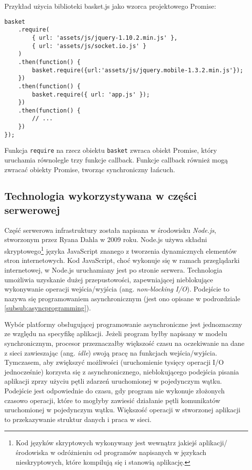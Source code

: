 Przykład użycia biblioteki basket.js jako wzorca projektowego Promise:

\lstset{language=JavaScript}
\begin{lstlisting}
basket
    .require(
		{ url: 'assets/js/jquery-1.10.2.min.js' },
		{ url: 'assets/js/socket.io.js' }
	)
    .then(function() {
        basket.require({url:'assets/js/jquery.mobile-1.3.2.min.js'});
    })
	.then(function() {
        basket.require({ url: 'app.js' });
    })
	.then(function() {
	 	// ...
	})
});
\end{lstlisting}

Funkcja \lstinline{require} na rzecz obiektu \lstinline{basket} zwraca obiekt Promise, który uruchamia równolegle trzy funkcje callback. Funkcje callback również mogą zwracać obiekty Promise, tworząc synchroniczny łańcuch.

\subsection{Technologia wykorzystywana w części serwerowej}
\label{sub:tool-server-technology}

Część serwerowa infrastruktury została napisana w środowisku \emph{Node.js}, stworzonym przez Ryana Dahla w 2009 roku. Node.js używa składni skryptowego\footnote{Kod języków skryptowych wykonywany jest wewnątrz jakiejś aplikacji/środowiska w odróżnieniu od programów napisanych w językach nieskryptowych, które kompilują się i stanowią aplikację.} języka JavaScript znanego z tworzenia dynamicznych elementów stron internetowych. Kod JavaScript, choć wykonuje się w ramach przeglądarki internetowej, w Node.js uruchamiany jest po stronie serwera. Technologia umożliwia uzyskanie dużej przepustowości, zapewniającej nieblokujące wykonywanie operacji wejścia/wyjścia (ang. \emph{non-blocking I/O}). Podejście to nazywa się programowaniem asynchronicznym (jest ono opisane w podrozdziale \ref{subsub:asyncprogramming}).

Wybór platformy obsługującej programowanie asynchroniczne jest jednoznaczny ze względu na specyfikę aplikacji. Jeżeli program byłby napisany w modelu synchronicznym, procesor przeznaczałby większość czasu na oczekiwanie na dane z sieci zawieszając (ang. \emph{idle}) swoją pracę na funkcjach wejścia/wyjścia. Tymczasem, aby zwiększyć możliwości (uruchomienie tysięcy operacji I/O jednocześnie) korzysta się z asynchronicznego, nieblokującego podejścia pisania aplikacji zprzy użyciu pętli zdarzeń uruchomionej w pojedynczym wątku. Podejście jest odpowiednie do czasu, gdy program nie wykonuje złożonych czasowo operacji, które to mogłyby zawiesić działanie pętli komunikatów uruchomionej w pojedynczym wątku. Większość operacji w stworzonej aplikacji to przekazywanie struktur danych i praca w sieci.

